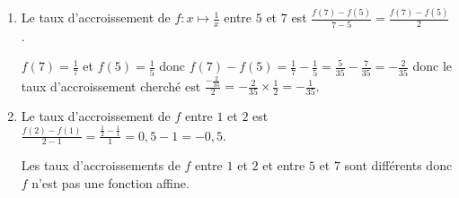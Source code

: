 %
%
%
%
\begin{exr}
  \begin{enumerate}
  \item Le taux d'accroissement de $f:x\mapsto \frac1x$ entre $5$ et $7$ est $\frac{f(7)-f(5)}{7-5}=\frac{f(7)-f(5)}{2}$.
  
\vspace*{0.5ex}  $f(7)=\frac17$ et $f(5)=\frac15$ donc $f(7)-f(5)=\frac17-\frac15=\frac{5}{35}-\frac{7}{35}=-\frac{2}{35}$ donc le taux d'accroissement cherché est $\frac{-\frac{2}{35}}{2}=-\frac{2}{35}\times\frac12=-\frac1{35}$.
  \item Le taux d'accroissement de $f$ entre $1$ et $2$ est $\frac{f(2)-f(1)}{2-1}=\frac{\frac12-\frac11}{1}=0,5-1=-0,5$.
  
  Les taux d'accroissements de $f$ entre $1$ et $2$ et entre $5$ et $7$ sont différents donc $f$ n'est pas une fonction affine.
  \end{enumerate}
\end{exr}
%
%
%
